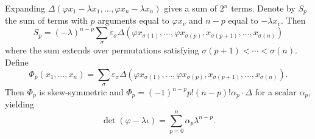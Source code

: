 Expanding $\Delta(\varphi x_1 - \lambda x_1, \ldots, \varphi x_n - \lambda x_n)$ gives a sum of $2^n$ terms. Denote by $S_p$ the sum of terms with $p$ arguments equal to $\varphi x_v$ and $n-p$ equal to $-\lambda x_v$. Then
$$S_p = (-\lambda)^{n-p} \sum_{\sigma} \varepsilon_{\sigma} \Delta(\varphi x_{\sigma(1)}, \ldots, \varphi x_{\sigma(p)}, x_{\sigma(p+1)}, \ldots, x_{\sigma(n)})$$
where the sum extends over permutations satisfying $\sigma(p+1) < \cdots < \sigma(n)$. Define
$$\Phi_p(x_1, \ldots, x_n) = \sum_{\sigma} \varepsilon_{\sigma} \Delta(\varphi x_{\sigma(1)}, \ldots, \varphi x_{\sigma(p)}, x_{\sigma(p+1)}, \ldots, x_{\sigma(n)}).$$
Then $\Phi_p$ is skew-symmetric and $\Phi_p = (-1)^{n-p} p!(n-p)! \alpha_p \cdot \Delta$ for a scalar $\alpha_p$, yielding
$$\det(\varphi - \lambda \iota) = \sum_{p=0}^{n} \alpha_p \lambda^{n-p}.$$
